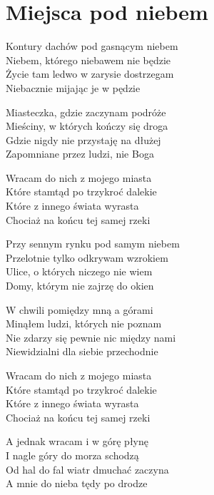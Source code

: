 \section{Miejsca pod niebem}
\begin{text}
    \hfill\break
    \hfill\break
    Kontury dachów pod gasnącym niebem\\
    Niebem, którego niebawem nie będzie\\
    Życie tam ledwo w zarysie dostrzegam\\
    Niebacznie mijając je w pędzie

    Miasteczka, gdzie zaczynam podróże\\
    Mieściny, w których kończy się droga\\
    Gdzie nigdy nie przystaję na dłużej\\
    Zapomniane przez ludzi, nie Boga

    \vin Wracam do nich z mojego miasta\\
    \vin Które stamtąd po trzykroć dalekie\\
    \vin Które z innego świata wyrasta\\
    \vin Chociaż na końcu tej samej rzeki

    Przy sennym rynku pod samym niebem\\
    Przelotnie tylko odkrywam wzrokiem\\
    Ulice, o których niczego nie wiem\\
    Domy, którym nie zajrzę do okien

    W chwili pomiędzy mną a górami\\
    Minąłem ludzi, których nie poznam\\
    Nie zdarzy się pewnie nic między nami\\
    Niewidzialni dla siebie przechodnie

    \vin Wracam do nich z mojego miasta\\
    \vin Które stamtąd po trzykroć dalekie\\
    \vin Które z innego świata wyrasta\\
    \vin Chociaż na końcu tej samej rzeki

    \vin A jednak wracam i w górę płynę\\
    \vin I nagle góry do morza schodzą\\
    \vin Od hal do fal wiatr dmuchać zaczyna\\
    \vin A mnie do nieba tędy po drodze
\end{text}
